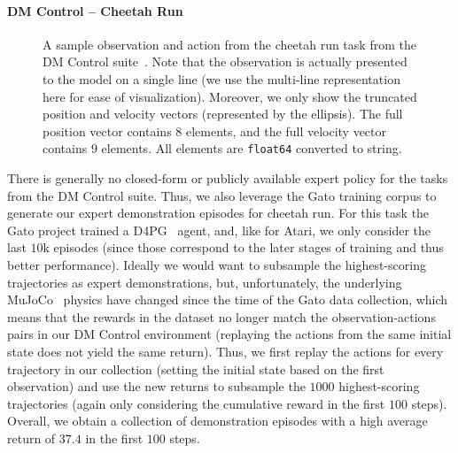 \paragraph{DM Control -- Cheetah Run}

\begin{figure}[t]
    \begin{center}
        \par\bigskip
    \end{center}
   \caption{
        A sample observation and action from the cheetah run task from the DM Control suite~\citep{tassa2018deepmind}.
        Note that the observation is actually presented to the model on a single line (we use the multi-line representation here for ease of visualization).
        Moreover, we only show the truncated position and velocity vectors (represented by the ellipsis).
        The full position vector contains $8$ elements, and the full velocity vector contains $9$ elements.
        All elements are \texttt{float64} converted to string.
    }
   \label{fig:observations-dm-control}
\end{figure}

There is generally no closed-form or publicly available expert policy for the tasks from the DM Control suite.
Thus, we also leverage the Gato training corpus to generate our expert demonstration episodes for cheetah run.
For this task the Gato project trained a D4PG~\citep{barth2018distributed} agent, and, like for Atari, we only consider the last $10$k episodes (since those correspond to the later stages of training and thus better performance). 
Ideally we would want to subsample the highest-scoring trajectories as expert demonstrations, but, unfortunately, the underlying MuJoCo~\citep{todorov2012mujoco} physics have changed since the time of the Gato data collection, which means that the rewards in the dataset no longer match the observation-actions pairs in our DM Control environment (\ie replaying the actions from the same initial state does not yield the same return).
Thus, we first replay the actions for every trajectory in our collection (setting the initial state based on the first observation) and use the new returns to subsample the $1000$ highest-scoring trajectories (again only considering the cumulative reward in the first $100$ steps).
Overall, we obtain a collection of demonstration episodes with a high average return of $37.4$ in the first $100$ steps.

